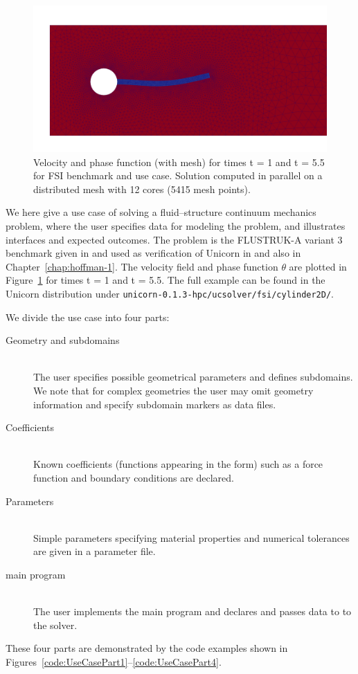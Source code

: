 \begin{figure}
  \includegraphics[width=\largefig]{chapters/hoffman-2/png/fsi3_theta_250.png}
  \caption{Velocity and phase function (with mesh) for times t = 1 and t = 5.5 for FSI benchmark and use case. Solution computed in parallel on a distributed mesh with 12 cores (5415 mesh points).}
  \label{fig:fsi2D_plot2}
\end{figure}

We here give a use case of solving a fluid--structure continuum
mechanics problem, where the user specifies data for modeling the
problem, and illustrates interfaces and expected outcomes. The problem
is the FLUSTRUK-A variant 3 benchmark given in \citep{HronTurek2005}
and used as verification of Unicorn
in \citep{HoffmanJanssonStockli2011} and also in
Chapter~\ref{chap:hoffman-1}. The velocity field and phase function
$\theta$ are plotted in Figure~\ref{fig:fsi2D_plot2} for times t = 1
and t = 5.5. The full example can be found in the Unicorn distribution
under {\tt unicorn-0.1.3-hpc/ucsolver/fsi/cylinder2D/}.

We divide the use case into four parts:

\begin{description}
\item[Geometry and subdomains] \ \\ The user specifies possible
  geometrical parameters and defines subdomains. We note that for
  complex geometries the user may omit geometry information and
  specify subdomain markers as data files.
\item[Coefficients] \ \\ Known coefficients (functions appearing in the form)
  such as a force function and boundary conditions are declared.
\item[Parameters] \ \\ Simple parameters specifying material properties and numerical tolerances are given
in a parameter file.
\item[main program] \ \\ The user implements the main program and
  declares and passes data to to the solver.
\end{description}
These four parts are demonstrated by the code examples shown in
Figures~\ref{code:UseCasePart1}--\ref{code:UseCasePart4}.


